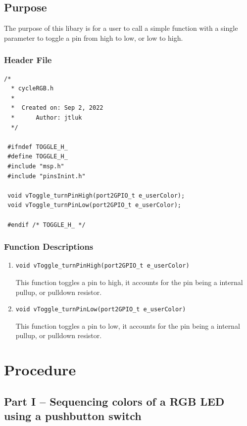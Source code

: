 \documentclass[11pt,a4paper]{article}
\begin{document}
\subsection{Purpose}
The purpose of this libary is for a user to call a simple function with a single parameter 
to toggle a pin from high to low, or low to high.

\subsubsection{Header File}

\begin{lstlisting}[style=CStyle]
  /*
  * cycleRGB.h
  *
  *  Created on: Sep 2, 2022
  *      Author: jtluk
  */
 
 #ifndef TOGGLE_H_
 #define TOGGLE_H_
 #include "msp.h"
 #include "pinsInint.h"
 
 void vToggle_turnPinHigh(port2GPIO_t e_userColor);
 void vToggle_turnPinLow(port2GPIO_t e_userColor);
 
 #endif /* TOGGLE_H_ */ 
\end{lstlisting}

\subsubsection{Function Descriptions}
\begin{enumerate}
  \item \begin{lstlisting}[style=functionStyle]
    void vToggle_turnPinHigh(port2GPIO_t e_userColor)
  \end{lstlisting}
  This function toggles a pin to high, it accounts for the pin being a internal pullup, or pulldown resistor.

  \item \begin{lstlisting}[style=functionStyle]
    void vToggle_turnPinLow(port2GPIO_t e_userColor)
  \end{lstlisting}
  This function toggles a pin to low, it accounts for the pin being a internal pullup, or pulldown resistor. 
\end{enumerate}
\newpage


\section{Procedure}
\subsection{Part I – Sequencing colors of a RGB LED using a pushbutton switch}
\end{document}
